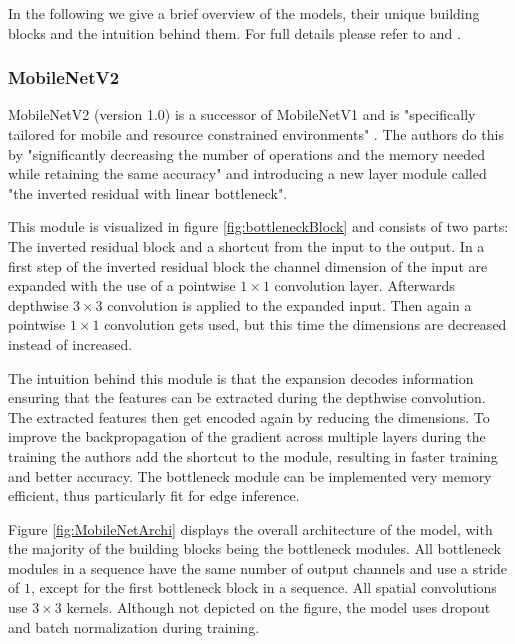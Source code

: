 In the following we give a brief overview of the models, their unique building blocks and the intuition behind them.
For full details please refer to \cite{DBLP:journals/corr/abs-1801-04381} and \cite{InceptionV4}.

\subsubsection{MobileNetV2}
MobileNetV2 (version 1.0) is a successor of MobileNetV1 and is "specifically tailored for mobile and resource
constrained environments" \cite{DBLP:journals/corr/abs-1801-04381}. The authors do this by "significantly decreasing the number of operations and the memory needed while retaining the same accuracy"  \cite{DBLP:journals/corr/abs-1801-04381} and introducing a new layer module called "the
inverted residual with linear bottleneck".

This module is visualized in figure \ref{fig:bottleneckBlock} and consists of two parts: The inverted residual block and a shortcut from the input to the output.
In a first step of the inverted residual block the channel dimension of the input are expanded with the use of a pointwise $1\times1$ convolution layer. 
Afterwards depthwise $3\times3$ convolution is applied to the expanded input. Then again a pointwise $1\times1$ convolution gets used, but this time the dimensions are decreased instead of increased.

The intuition behind this module is that the expansion decodes information ensuring that the features can be extracted during the depthwise convolution. The extracted features then get encoded again by reducing the dimensions.
To improve the backpropagation of the gradient across multiple layers during the training the authors add the shortcut to the module, resulting in faster training and better accuracy.
The bottleneck module can be implemented very memory efficient, thus particularly fit for edge inference.

Figure \ref{fig:MobileNetArchi} displays the overall architecture of the model, with the majority of the building blocks being the bottleneck modules.
All bottleneck modules in a sequence have the same number of output channels and use a stride of $1$, except for the first bottleneck block in a sequence. All spatial convolutions use $3\times3$ kernels. 
Although not depicted on the figure, the model uses dropout and batch normalization during training.

